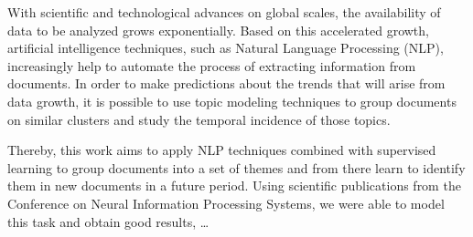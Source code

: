 With scientific and technological advances on global scales, the availability of data to be analyzed grows exponentially. Based on this accelerated growth, artificial intelligence techniques, such as Natural Language Processing (NLP), increasingly help to automate the process of extracting information from documents. In order to make predictions about the trends that will arise from data growth, it is possible to use topic modeling techniques to group documents on similar clusters and study the temporal incidence of those topics.

Thereby, this work aims to apply NLP techniques combined with supervised learning to group documents into a set of themes and from there learn to identify them in new documents in a future period. Using scientific publications from the Conference on Neural Information Processing Systems, we were able to model this task and obtain good results, \dots
